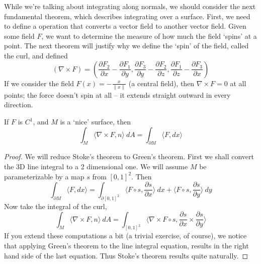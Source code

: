 While we're talking about integrating along normals, we should consider the next fundamental theorem, which describes integrating over a surface. First, we need to define a operation that converts a vector field to another vector field. Given some field $F$, we want to determine the measure of how much the field `spins' at a point. The next theorem will justify why we define the `spin' of the field, called the curl, and defined
%
\[ (\nabla \times F) = \left(\frac{\partial F_2}{\partial x} - \frac{\partial F_1}{\partial y}, \frac{\partial F_3}{\partial y} - \frac{\partial F_2}{\partial z}, \frac{\partial F_1}{\partial z} - \frac{\partial F_3}{\partial x}\right) \]
%
If we consider the field $F(x) = -\frac{x}{\|x\|}$ (a central field), then $\nabla \times F = 0$ at all points; the force doesn't spin at all -- it extends straight outward in every direction.

\begin{theorem}
    If $F$ is $C^1$, and $M$ is a `nice' surface, then
    \[ \int_M \langle \nabla \times F, n \rangle\ dA = \int_{\partial M} \langle F, dx \rangle \]
\end{theorem}
\begin{proof}
    We will reduce Stoke's theorem to Green's theorem. First we shall convert the 3D line integral to a 2 dimensional one. We will assume $M$ be parameterizable by a map $s$ from $[0,1]^2$. Then
    \[ \int_{\partial M} \langle F, dx \rangle = \int_{\partial [0,1]^2} \langle F \circ s, \frac{\partial s}{\partial x} \rangle\ dx + \langle F \circ s, \frac{\partial s}{\partial y} \rangle\ dy \]
    Now take the integral of the curl,
    \[ \int_M \langle \nabla \times F, n \rangle\ dA = \int_{[0,1]^2} \langle \nabla \times F \circ s, \frac{\partial s}{\partial x} \times \frac{\partial s}{\partial y} \rangle \]
    If you extend these computations a bit (a trivial exercise, of course), we notice that applying Green's theorem to the line integral equation, results in the right hand side of the last equation. Thus Stoke's theorem results quite naturally.
\end{proof}

